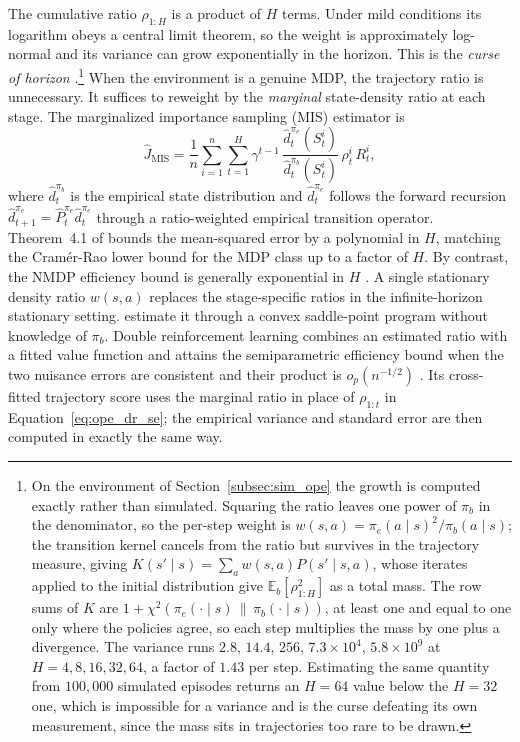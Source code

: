 The cumulative ratio $\rho_{1:H}$ is a product of $H$ terms. Under mild conditions its logarithm obeys a central limit theorem, so the weight is approximately log-normal and its variance can grow exponentially in the horizon. This is the \emph{curse of horizon} \citep{xie2019marginalized}.\footnote{On the environment of Section~\ref{subsec:sim_ope} the growth is computed exactly rather than simulated. Squaring the ratio leaves one power of $\pi_b$ in the denominator, so the per-step weight is $w(s,a)=\pi_e(a\mid s)^2/\pi_b(a\mid s)$; the transition kernel cancels from the ratio but survives in the trajectory measure, giving $K(s'\mid s)=\sum_a w(s,a)P(s'\mid s,a)$, whose iterates applied to the initial distribution give $\mathbb E_b[\rho_{1:H}^2]$ as a total mass. The row sums of $K$ are $1+\chi^2(\pi_e(\cdot\mid s)\,\|\,\pi_b(\cdot\mid s))$, at least one and equal to one only where the policies agree, so each step multiplies the mass by one plus a divergence. The variance runs $2.8$, $14.4$, $256$, $7.3\times10^{4}$, $5.8\times10^{9}$ at $H=4,8,16,32,64$, a factor of $1.43$ per step. Estimating the same quantity from $100{,}000$ simulated episodes returns an $H=64$ value below the $H=32$ one, which is impossible for a variance and is the curse defeating its own measurement, since the mass sits in trajectories too rare to be drawn.} When the environment is a genuine MDP, the trajectory ratio is unnecessary. It suffices to reweight by the \emph{marginal} state-density ratio at each stage. The marginalized importance sampling (MIS) estimator is
\begin{equation}
\hat{J}_{\mathrm{MIS}} = \frac{1}{n} \sum_{i=1}^{n} \sum_{t=1}^{H} \gamma^{t-1}\, \frac{\hat{d}^{\pi_e}_t(S^i_t)}{\hat{d}^{\pi_b}_t(S^i_t)}\, \rho^i_t\, R^i_t,
\label{eq:ope_mis}
\end{equation}
where $\hat{d}^{\pi_b}_t$ is the empirical state distribution and $\hat{d}^{\pi_e}_t$ follows the forward recursion $\hat{d}^{\pi_e}_{t+1} = \hat{P}^{\pi_e}_t \hat{d}^{\pi_e}_t$ through a ratio-weighted empirical transition operator. Theorem~4.1 of \citet{xie2019marginalized} bounds the mean-squared error by a polynomial in $H$, matching the Cramér-Rao lower bound for the MDP class up to a factor of $H$. By contrast, the NMDP efficiency bound is generally exponential in $H$ \citep{kallusUehara2022doubleRL}. A single stationary density ratio $w(s,a)$ replaces the stage-specific ratios in the infinite-horizon stationary setting. \citet{nachum2019dualdice} estimate it through a convex saddle-point program without knowledge of $\pi_b$. Double reinforcement learning combines an estimated ratio with a fitted value function and attains the semiparametric efficiency bound when the two nuisance errors are consistent and their product is $o_p(n^{-1/2})$ \citep{kallusUehara2022doubleRL}. Its cross-fitted trajectory score uses the marginal ratio in place of $\rho_{1:t}$ in Equation~\eqref{eq:ope_dr_se}; the empirical variance and standard error are then computed in exactly the same way.

